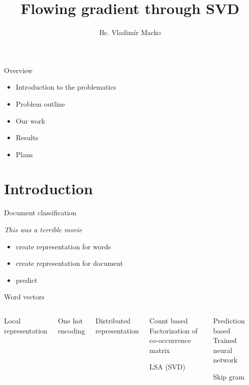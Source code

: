 \documentclass[xcolor={table}]{beamer}
\title{Flowing gradient through SVD}
\author{Bc. Vladimír Macko}
\institute{RNDr. Radim Řehůřek, Ph.D}
\begin{document}
        
\begin{frame}
    \titlepage
\end{frame}
    
\begin{frame}{Overview}
    \begin{block}{}
        \begin{itemize}
            \item Introduction to the problematics
            \item Problem outline
            \item Our work
            \item Results
            \item Plans
        \end{itemize}
    \end{block}
\end{frame}


\section{Introduction}
\begin{frame}{Document classification}
    \begin{block}{}
        \emph{This was a terrible movie}
    \end{block}
    
    \begin{block}{}   
        \begin{itemize}
            \item create representation for words
            \item create representation for document
            \item predict
        \end{itemize}
    \end{block}
\end{frame} 

\begin{frame}{Word vectors}
    \begin{columns}
        Local representation
        \begin{block}{}
            One hot encoding
        \end{block}

        Distributed representation
        \begin{block}{Count based}
            Factorization of co-occurrence matrix
            
            LSA (SVD)
        \end{block}
        \begin{block}{Prediction based}
            Trained neural network

            Skip gram    
        \end{block}    
   \end{columns}
\end{frame} 
\end{document}
